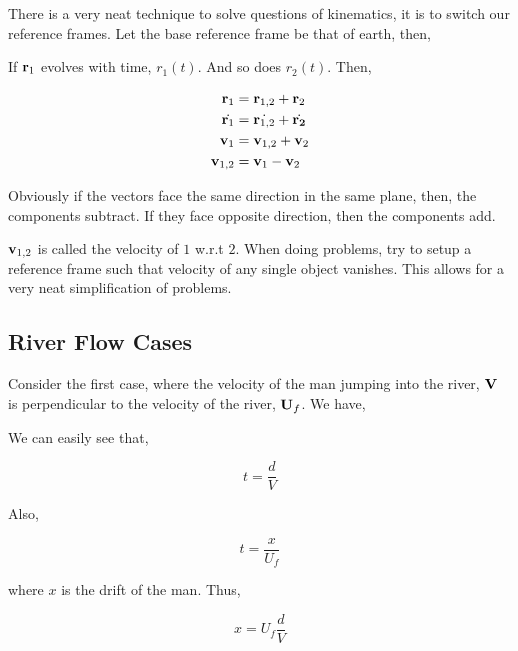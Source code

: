 There is a very neat technique to solve questions of kinematics, it is to switch our 
reference frames. Let the base reference frame be that of earth, then,

\begin{figure}
    [H]
    \centering
\end{figure}

If \(\boldsymbol{\mathbf{r}}_1\) evolves with time, \(r_1(t)\). And so does \(r_2(t)\). Then,

\begin{align*}
    \boldsymbol{\mathbf{r}}_1 &= \boldsymbol{\mathbf{r}}_{1,2} + \boldsymbol{\mathbf{r}}_2 \\
    \dot{\boldsymbol{\mathbf{r}}_1} &= \dot{\boldsymbol{\mathbf{r}}_{1,2}} + \dot{\boldsymbol{\mathbf{r_2}}} \\
    \boldsymbol{\mathbf{v}}_1 &= \boldsymbol{\mathbf{v}}_{1,2} + \boldsymbol{\mathbf{v}}_{2}\\
    \boldsymbol{\mathbf{v}}_{1,2} &= \boldsymbol{\mathbf{v}}_1 - \boldsymbol{\mathbf{v}}_{2}
\end{align*}

Obviously if the vectors face the same direction in the same plane, then, the components subtract. If they face
opposite direction, then the components add. 

\(\boldsymbol{\mathbf{v}}_{1,2}\) is called the velocity of \(\mathit{1}\) w.r.t \(\mathit{2}\). When doing
problems, try to setup a reference frame such that velocity of any single object vanishes.
This allows for a very neat simplification of problems. 

\subsection{River Flow Cases}

Consider the first case, where the velocity of the man jumping into the river, \(\boldsymbol{\mathbf{V}}\) is
perpendicular to the velocity of the river, \(\boldsymbol{\mathbf{U}}_f\). We have,

\begin{figure}[H]
    \centering
\end{figure}

We can easily see that,

\[
    t = \frac{d}{V}
\]

Also, 

\[
    t = \frac{x}{U_f}
\]

where \(x\) is the drift of the man. Thus,

\begin{equation}
    x = U_f\frac{d}{V}
\end{equation}

